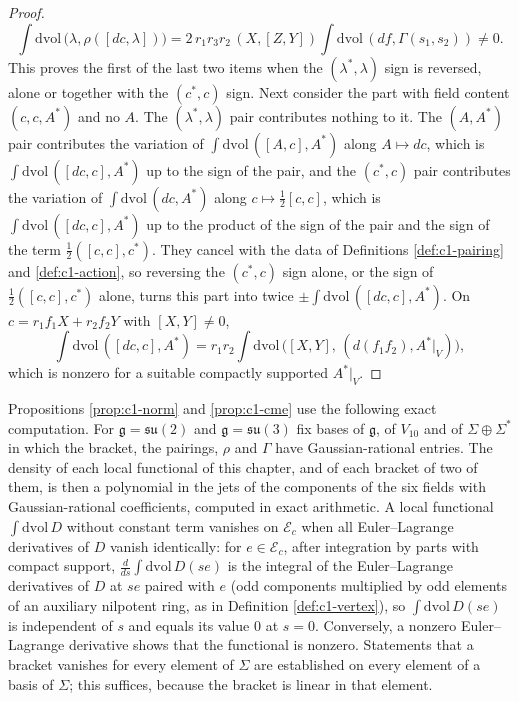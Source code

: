 \begin{proof}
\[
\int\mathrm{dvol}\,\big(\lambda,\rho([dc,\lambda])\big)=2\,r_1r_3r_2\,(X,[Z,Y])\int\mathrm{dvol}\,(df,\Gamma(s_1,s_2))\neq0 .
\]
This proves the first of the last two items when the $(\lambda^*,\lambda)$ sign is reversed, alone or together with the $(c^*,c)$ sign. Next consider the part with field content $(c,c,A^*)$ and no $A$. The $(\lambda^*,\lambda)$ pair contributes nothing to it. The $(A,A^*)$ pair contributes the variation of $\int\mathrm{dvol}\,([A,c],A^*)$ along $A\mapsto dc$, which is $\int\mathrm{dvol}\,([dc,c],A^*)$ up to the sign of the pair, and the $(c^*,c)$ pair contributes the variation of $\int\mathrm{dvol}\,(dc,A^*)$ along $c\mapsto\tfrac12[c,c]$, which is $\int\mathrm{dvol}\,([dc,c],A^*)$ up to the product of the sign of the pair and the sign of the term $\tfrac12([c,c],c^*)$. They cancel with the data of Definitions \ref{def:c1-pairing} and \ref{def:c1-action}, so reversing the $(c^*,c)$ sign alone, or the sign of $\tfrac12([c,c],c^*)$ alone, turns this part into twice $\pm\int\mathrm{dvol}\,([dc,c],A^*)$. On $c=r_1f_1X+r_2f_2Y$ with $[X,Y]\neq0$,
\[
\int\mathrm{dvol}\,([dc,c],A^*)=r_1r_2\int\mathrm{dvol}\,\big([X,Y],\,(d(f_1f_2),A^*|_V)\big),
\]
which is nonzero for a suitable compactly supported $A^*|_V$.
\end{proof}

\begin{remark}
\label{rem:c1-method}
Propositions \ref{prop:c1-norm} and \ref{prop:c1-cme} use the following exact computation. For $\mathfrak g=\mathfrak{su}(2)$ and $\mathfrak g=\mathfrak{su}(3)$ fix bases of $\mathfrak g$, of $V_{10}$ and of $\Sigma\oplus\Sigma^*$ in which the bracket, the pairings, $\rho$ and $\Gamma$ have Gaussian-rational entries. The density of each local functional of this chapter, and of each bracket of two of them, is then a polynomial in the jets of the components of the six fields with Gaussian-rational coefficients, computed in exact arithmetic. A local functional $\int\mathrm{dvol}\,D$ without constant term vanishes on $\mathscr E_c$ when all Euler--Lagrange derivatives of $D$ vanish identically: for $e\in\mathscr E_c$, after integration by parts with compact support, $\frac{d}{ds}\int\mathrm{dvol}\,D(se)$ is the integral of the Euler--Lagrange derivatives of $D$ at $se$ paired with $e$ (odd components multiplied by odd elements of an auxiliary nilpotent ring, as in Definition \ref{def:c1-vertex}), so $\int\mathrm{dvol}\,D(se)$ is independent of $s$ and equals its value $0$ at $s=0$. Conversely, a nonzero Euler--Lagrange derivative shows that the functional is nonzero. Statements that a bracket vanishes for every element of $\Sigma$ are established on every element of a basis of $\Sigma$; this suffices, because the bracket is linear in that element.
\end{remark}
